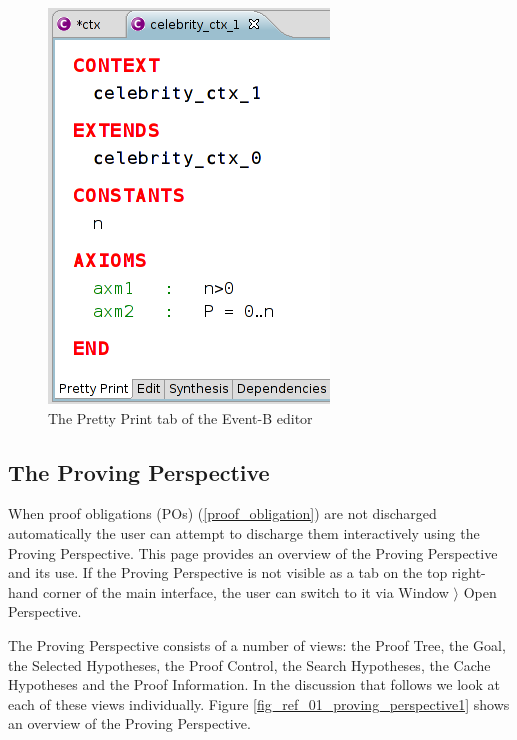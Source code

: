 \begin{figure}[!h]
\begin{center}
	\includegraphics{img/reference/ref_01_eventb_editor10.png}
	\caption{The Pretty Print tab of the Event-B editor}
	\label{fig_ref_01_eventb_editor10}
\end{center}
\end{figure}

\subsection{The Proving Perspective}
\label{ref_01_proving_perspective}

When proof obligations (POs) (\ref{proof_obligation}) are not discharged automatically the user can attempt to discharge them interactively using the Proving Perspective. This page provides an overview of the Proving Perspective and its use. If the Proving Perspective is not visible as a tab on the top right-hand corner of the main interface, the user can switch to it via \textsf{Window $\rangle$ Open Perspective}.

The Proving Perspective consists of a number of views: the \textsf{Proof Tree}, the \textsf{Goal}, the \textsf{Selected Hypotheses}, the \textsf{Proof Control}, the \textsf{Search Hypotheses}, the \textsf{Cache Hypotheses} and the \textsf{Proof Information}. In the discussion that follows we look at each of these views individually. Figure \ref{fig_ref_01_proving_perspective1} shows an overview of the Proving Perspective.


